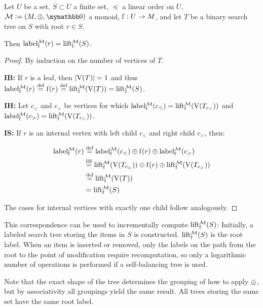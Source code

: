 \begin{proposition}
Let $U$ be a set, $S \subset U$ a finite set, $\preceq$ a linear order on $U$, $\mathcal{M} \defeq (M, \groupaddsym, \neutraladd)$ a monoid, ${\operatorname{f}}: {U} \rightarrow {M}$, and let $T$ be a binary search tree on $S$ with root $r \in S$.

Then $\operatorname{label_{\operatorname{f}}^{\mathcal{M}}}(r) = \operatorname{lift_{\operatorname{f}}^{\mathcal{M}}}(S)$.

\begin{proof}
By induction on the number of vertices of $T$.

\textbf{IB:} If $r$ is a leaf, then $|{\operatorname{V}(T)}| = 1$ and thus $\operatorname{label_{\operatorname{f}}^{\mathcal{M}}}(r) \overset{\text{def}}= \operatorname{f}(r) \overset{\text{def}}= \operatorname{lift_{\operatorname{f}}^{\mathcal{M}}}(\operatorname{V}(T)) = \operatorname{lift_{\operatorname{f}}^{\mathcal{M}}}(S)$.

\textbf{IH:} Let  $c_{<}$ and $c_{>}$ be vertices for which $\operatorname{label_{\operatorname{f}}^{\mathcal{M}}}(c_{<}) = \operatorname{lift_{\operatorname{f}}^{\mathcal{M}}}(\operatorname{V}(T_{c_{<}}))$ and $\operatorname{label_{\operatorname{f}}^{\mathcal{M}}}(c_{>}) = \operatorname{lift_{\operatorname{f}}^{\mathcal{M}}}(\operatorname{V}(T_{c_{>}}))$.

\textbf{IS:} If $r$ is an internal vertex with left child $c_{<}$ and right child $c_{>}$, then:

\begin{align*}
 \operatorname{label_{\operatorname{f}}^{\mathcal{M}}}(r) &\overset{\text{def}}= {\operatorname{label_{\operatorname{f}}^{\mathcal{M}}}(c_{<})} \oplus {{\operatorname{f}(r)} \oplus{\operatorname{label_{\operatorname{f}}^{\mathcal{M}}}(c_{>})}}\\
&\overset{\text{IH}}= {\operatorname{lift_{\operatorname{f}}^{\mathcal{M}}}(\operatorname{V}(T_{c_{<}}))} \oplus {{\operatorname{f}(r)} \oplus{\operatorname{lift_{\operatorname{f}}^{\mathcal{M}}}(\operatorname{V}(T_{c_{>}}))}}\\
& \overset{\text{def}}= \operatorname{lift_{\operatorname{f}}^{\mathcal{M}}}(\operatorname{V}(T))\\
&= \operatorname{lift_{\operatorname{f}}^{\mathcal{M}}}(S)\\
\end{align*}

The cases for internal vertices with exactly one child follow analogously.
\end{proof}
\end{proposition}

This correspondence can be used to incrementally compute $\operatorname{lift_{\operatorname{f}}^{\mathcal{M}}}(S)$: Initially, a labeled search tree storing the items in $S$ is constructed. $\operatorname{lift_{\operatorname{f}}^{\mathcal{M}}}(S)$ is the root label. When an item is inserted or removed, only the labels on the path from the root to the point of modification require recomputation, so only a logarithmic number of operations is performed if a self-balancing tree is used.

Note that the exact shape of the tree determines the grouping of how to apply $\oplus$, but by associativity all groupings yield the same result. All trees storing the same set have the same root label.

